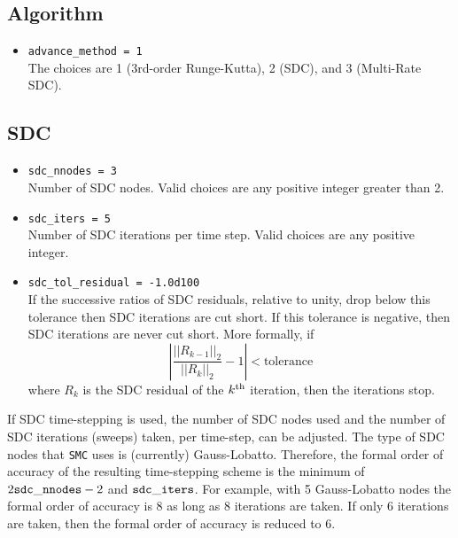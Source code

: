 \documentclass[11pt,letterpaper]{article}
\begin{document}
\subsection{Algorithm}

\begin{itemize}
\item {\tt advance\_method = 1}\\
  The choices are 1 (3rd-order Runge-Kutta), 2 (SDC), and 3
  (Multi-Rate SDC).
\end{itemize}

\subsection{SDC}

\begin{itemize}
\item {\tt sdc\_nnodes = 3}\\
  Number of SDC nodes.  Valid choices are any positive integer greater
  than 2.
\item {\tt sdc\_iters = 5}\\
  Number of SDC iterations per time step.  Valid choices are any
  positive integer.
\item {\tt sdc\_tol\_residual = -1.0d100}\\
  If the successive ratios of SDC residuals, relative to unity, drop
  below this tolerance then SDC iterations are cut short.  If this
  tolerance is negative, then SDC iterations are never cut short.
  More formally, if
  \begin{equation*}
    \left| \frac{||R_{k-1}||_2}{||R_k||_2} - 1 \right| < \text{tolerance}
  \end{equation*}
  where $R_k$ is the SDC residual of the $k^{\rm th}$ iteration, then
  the iterations stop.
\end{itemize}

If SDC time-stepping is used, the number of SDC nodes used and the
number of SDC iterations (sweeps) taken, per time-step, can be
adjusted.  The type of SDC nodes that {\tt SMC} uses is (currently)
Gauss-Lobatto.  Therefore, the formal order of accuracy of the
resulting time-stepping scheme is the minimum of $2{\tt sdc\_nnodes} -
2$ and ${\tt sdc\_iters}$.  For example, with 5 Gauss-Lobatto
nodes the formal order of accuracy is 8 as long as 8 iterations are
taken.  If only 6 iterations are taken, then the formal order of
accuracy is reduced to 6.
\end{document}
